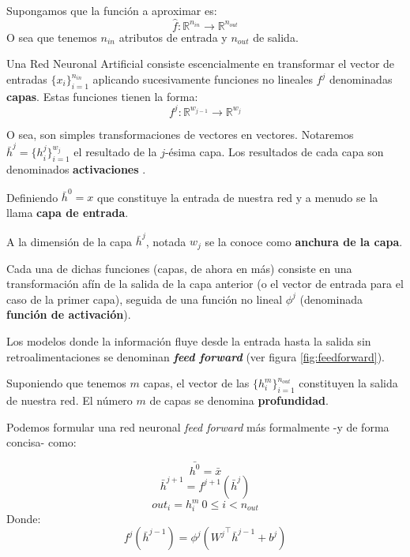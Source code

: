 Supongamos que la función a aproximar es: 
\begin{equation*}
\hat{f} : \mathbb{R}^{n_{in}} \rightarrow \mathbb{R}^{n_{out}}
\end{equation*}
O sea que tenemos $n_{in}$ atributos de entrada y $n_{out}$ de salida.


Una Red Neuronal Artificial consiste escencialmente en transformar el vector de entradas $\{x_i\}_{i=1}^{n_{in}}$ aplicando sucesivamente funciones no lineales $f^j$ denominadas \textbf{capas}. Estas funciones tienen la forma:
\begin{equation*}
    f^j : \mathbb{R}^{w_{j-1}} \rightarrow \mathbb{R}^{w_j}
\end{equation*}

O sea, son simples transformaciones de vectores en vectores. Notaremos $\bar{h}^j = \{h_i^j\}_{i=1}^{w_j}$ el resultado de la $j$-ésima capa. Los resultados de cada capa son denominados \textbf{activaciones} \cite{libro-nielsen}. 

Definiendo $\bar{h}^0 = x$ que constituye la entrada de nuestra red y a menudo se la llama \textbf{capa de entrada}. 

A la dimensión de la capa $\bar{h}^j$, notada $w_j$ se la conoce como \textbf{anchura de la capa}.


Cada una de dichas funciones (capas, de ahora en más) consiste en una transformación afín de la salida de la capa anterior (o el vector de entrada para el caso de la primer capa), seguida de una función no lineal $\phi^j$ (denominada \textbf{función de activación}). 


Los modelos donde la información fluye desde la entrada hasta la salida sin retroalimentaciones se denominan \textit{\textbf{feed forward}} (ver figura \ref{fig:feedforward}). 

Suponiendo que tenemos $m$ capas, el vector de las $\{h_i^m\}_{i=1}^{n_{out}}$ constituyen la salida de nuestra red. El número $m$ de capas se denomina \textbf{profundidad}.

Podemos formular una red neuronal \textit{feed forward} más formalmente -y de forma concisa- como:

\begin{equation*}
    \bar{h^0} = \bar{x}
\end{equation*}
\begin{equation*}
    \bar{h}^{j+1} = f^{j+1}(\bar{h}^j)
\end{equation*}
\begin{equation*}
    out_i = h_i^m ~ 0 \leq i < n_{out}
\end{equation*}
Donde:
\begin{equation*}
    f^j(\bar{h}^{j-1}) = \phi^j( {W^j}^\top \bar{h}^{j-1} + b^j)
\end{equation*}

